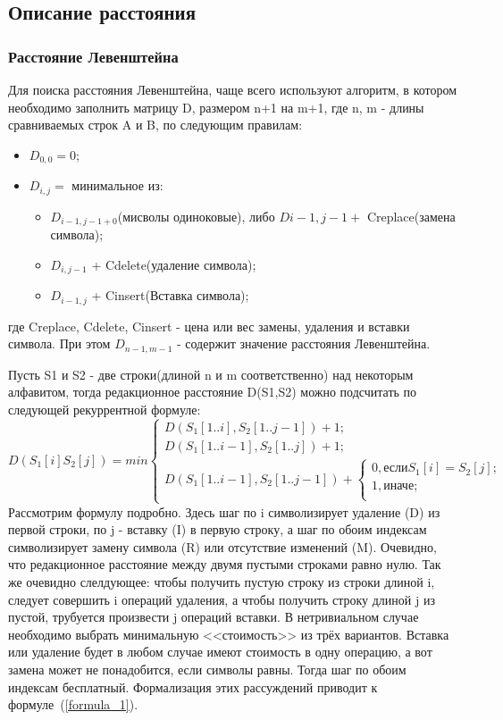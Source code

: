 \documentclass[a4paper]{article}
\begin{document}
	\subsection{Описание расстояния}
	\subsubsection{Расстояние Левенштейна} Для поиска расстояния Левенштейна, чаще всего используют алгоритм, в котором необходимо заполнить матрицу D, размером n+1 на m+1, где n, m - длины сравниваемых строк A и B, по следующим правилам:
	\begin{itemize}
		\item $D_{0,0} = 0$;
		\item $D_{i,j} = $ минимальное из:
		\begin{itemize}
			\item $D_{i-1, j-1+0}$(мисволы одиноковые), либо $D{i-1, j-1} + $ Creplace(замена символа);
			\item $D_{i, j-1}$ + Cdelete(удаление символа);
			\item $D_{i-1, j}$ + Cinsert(Вставка символа);
		\end{itemize}
	\end{itemize}
	где Creplace, Cdelete, Cinsert - цена или вес замены, удаления и вставки символа. При этом $D_{n-1, m-1}$ - содержит значение расстояния Левенштейна.
	
	Пусть S1 и S2 - две строки(длиной n и m соответственно) над некоторым алфавитом, тогда редакционное расстояние D(S1,S2) можно подсчитать по следующей рекуррентной формуле:
	\begin{equation} 
		D(S_1[i]S_2[j]) = min 
			\begin{cases}
				D(S_1[1..i], S_2[1..j-1]) + 1;\\
				D(S_1[1..i-1], S_2[1..j]) + 1;\\
				D(S_1[1..i-1], S_2[1..j-1]) + \begin{cases}
					0, \text {если}  S_1[i] = S_2[j];\\
					1, \text{иначе};\\
				\end{cases}	
			\end{cases}
	\label{formula_1}
	\end{equation}
	Рассмотрим формулу подробно. Здесь шаг по i символизирует удаление (D) из первой строки, по j - вставку (I) в первую строку, а шаг по обоим индексам символизирует замену символа (R) или отсутствие изменений (M). Очевидно, что редакционное расстояние между двумя пустыми строками равно нулю. Так же очевидно слелдующее: чтобы получить пустую строку из строки длиной i, следует совершить i операций удаления, а чтобы получить строку длиной j из пустой, трубуется произвести j операций вставки. В нетривиальном случае необходимо выбрать минимальную <<стоимость>> из трёх вариантов. Вставка или удаление будет в любом случае имеют стоимость  в одну операцию, а вот замена может не понадобится, если символы равны. Тогда шаг по обоим индексам бесплатный. Формализация этих рассуждений приводит к формуле~(\ref{formula_1}).
\end{document}
